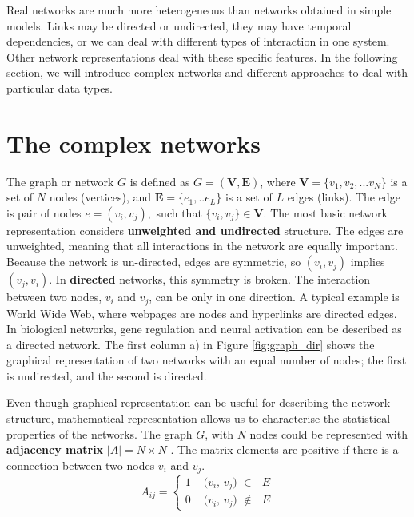 Real networks are much more heterogeneous than networks obtained in simple models. Links may be directed or undirected, they may have temporal dependencies, or we can deal with different types of interaction in one system. Other network representations deal with these specific features. In the following section, we will introduce complex networks and different approaches to deal with particular data types. 
\newpage
\section{The complex networks}

The graph or network $G$ is defined as $G=(\boldsymbol{V}, \boldsymbol{E})$, where $\boldsymbol{V} = \{ v_1, v_2, ... v_N\}$ is a set of $N$ nodes (vertices), and  $\boldsymbol{E} = \{e_1, .. e_L\}$ is a set of $L$ edges (links). The edge is pair of nodes $e = (v_i, v_j), $ such that $\{v_i,v_j\}\in \boldsymbol{V}$. The most basic network representation considers \textbf{unweighted and undirected} structure. The edges are unweighted, meaning that all interactions in the network are equally important. Because the network is un-directed, edges are symmetric, so $(v_i, v_j)$ implies $(v_j, v_i)$. In \textbf{directed} networks, this symmetry is broken. The interaction between two nodes, $v_i$ and $v_j$, can be only in one direction. A typical example is World Wide Web, where webpages are nodes and hyperlinks are directed edges. In biological networks, gene regulation and neural activation can be described as a directed network. The first column a) in Figure \ref{fig:graph_dir} shows the graphical representation of two networks with an equal number of nodes; the first is undirected, and the second is directed. 

Even though graphical representation can be useful for describing the network structure, mathematical representation allows us to characterise the statistical properties of the networks. The graph $G$, with $N$ nodes could be represented with \textbf{adjacency matrix} $|A| = N \times N$ \cite{boccaletti2006complex}. The matrix elements are positive if there is a connection between two nodes $v_i$ and $v_j$. 
\begin{equation}
A_{ij} =
\begin{cases}
1 & \text{ ($v_i$, $v_j$) $\in$ $E$}\\
0 & \text{ ($v_i$, $v_j$) $\notin$ $E$}
\end{cases}       
\end{equation}

